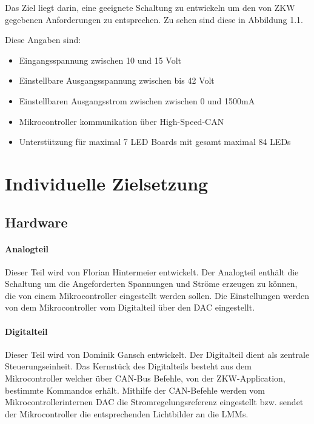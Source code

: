 \documentclass[paper=a4, 12pt]{scrreprt}
\begin{document}
	Das Ziel liegt darin, eine geeignete Schaltung zu entwickeln um den von ZKW gegebenen Anforderungen zu entsprechen. Zu sehen sind diese in Abbildung 1.1.
	
	Diese Angaben sind:
	\begin{itemize}
		\item{Eingangsspannung zwischen 10 und 15 Volt}
		\item{Einstellbare Ausgangsspannung zwischen bis 42 Volt}
		\item{Einstellbaren Ausgangsstrom zwischen zwischen 0 und 1500mA}
		\item{Mikrocontroller kommunikation über High-Speed-CAN}
		\item{Unterstützung für maximal 7 LED Boards mit gesamt maximal 84 LEDs}
	\end{itemize}
	

\chapter{Individuelle Zielsetzung}
    \section{Hardware}    	
    	\subsubsection{Analogteil}
        Dieser Teil wird von Florian Hintermeier entwickelt. Der Analogteil enthält die Schaltung um die Angeforderten Spannungen und Ströme erzeugen zu können, die von einem Mikrocontroller eingestellt werden sollen. Die Einstellungen werden von dem Mikrocontroller vom Digitalteil über den DAC eingestellt.
        
        \subsubsection{Digitalteil}
        Dieser Teil wird von Dominik Gansch entwickelt. Der Digitalteil dient als zentrale Steuerungseinheit. Das Kernstück des Digitalteils besteht aus dem Mikrocontroller welcher über CAN-Bus Befehle, von der ZKW-Application, bestimmte Kommandos erhält. Mithilfe der  CAN-Befehle werden vom Mikrocontrollerinternen DAC die Stromregelungsreferenz eingestellt bzw. sendet der Mikrocontroller die entsprechenden Lichtbilder an die LMMs.%
\end{document}
